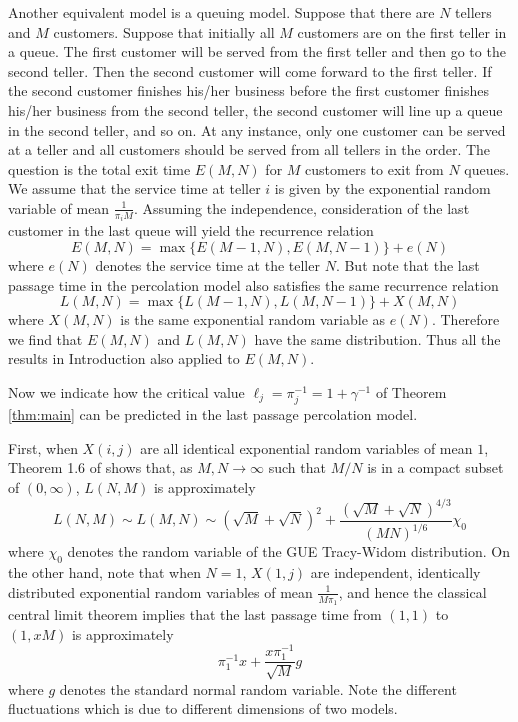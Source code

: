 \documentclass[11pt]{article}
\begin{document}
Another equivalent model is a queuing model. Suppose that there
are $N$ tellers and $M$ customers. Suppose that initially all $M$
customers are on the first teller in a queue. The first customer
will be served from the first teller and then go to the second
teller. Then the second customer will come forward to the first
teller. If the second customer finishes his/her business before
the first customer finishes his/her business from the second
teller, the second customer will line up a queue in the second
teller, and so on. At any instance, only one customer can be
served at a teller and all customers should be served from all
tellers in the order. The question is the total exit time $E(M,N)$
for $M$ customers to exit from $N$ queues. We assume that the
service time at teller $i$ is given by the exponential random
variable of mean $\frac1{\pi_i M}$. Assuming the independence,
consideration of the last customer in the last queue will yield
the recurrence relation
\begin{equation}
  E(M,N) = \max\{ E(M-1, N), E(M,N-1)\} + e(N)
\end{equation}
where $e(N)$ denotes the service time at the teller $N$. But note that
the last passage time in the percolation model also satisfies the same recurrence
relation
\begin{equation}
  L(M,N) = \max\{ L(M-1, N), L(M,N-1)\} + X(M,N)
\end{equation}
where $X(M,N)$ is the same exponential random variable as $e(N)$.
Therefore we find that $E(M,N)$ and $L(M,N)$ have the same distribution.
Thus all the results in Introduction also applied to $E(M,N)$.


\bigskip

Now we indicate how the critical value $\ell_j= \pi_j^{-1}= 1+\gamma^{-1}$ of
Theorem \ref{thm:main} can be predicted in the last passage
percolation model.

First, when $X(i,j)$ are all identical exponential random
variables of mean $1$, Theorem 1.6 of \cite{kurtj:shape} shows
that, as $M,N\to\infty$ such that $M/N$ is in a compact subset of
$(0,\infty)$, $L(N,M)$ is approximately
\begin{equation}\label{eq:lp1}
  L(N,M) \sim L(M,N) \sim (\sqrt{M}+\sqrt{N})^2 +
  \frac{(\sqrt{M}+\sqrt{N})^{4/3}}{(MN)^{1/6}}  \chi_0
\end{equation}
where $\chi_0$ denotes the random variable of the GUE Tracy-Widom
distribution. On the other hand, note that when $N=1$, $X(1,j)$
are independent, identically distributed exponential random
variables of mean $\frac1{M\pi_1}$, and hence the classical
central limit theorem implies that the last passage time from
$(1,1)$ to $(1,xM)$ is approximately
\begin{equation}\label{eq:lp2}
  \pi_1^{-1}x + \frac{x\pi_1^{-1}}{\sqrt{M}} g
\end{equation}
where $g$ denotes the standard normal random variable. Note the
different fluctuations which is due to different dimensions of two
models.
\end{document}
